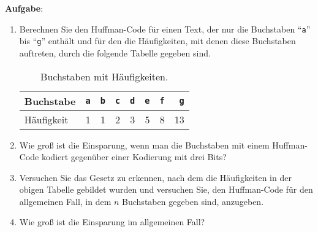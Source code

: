 \noindent
\textbf{Aufgabe}:
\begin{enumerate}
\item Berechnen Sie den Huffman-Code f\"ur einen Text, der nur die Buchstaben
      ``\texttt{a}'' bis ``\texttt{g}'' enth\"alt und f\"ur den die H\"aufigkeiten,
      mit denen diese Buchstaben auftreten, durch die folgende Tabelle gegeben sind.

\begin{table}[htbp]
  \centering
\begin{tabular}[t]{|l|r|r|r|r|r|r|r|}
\hline
Buchstabe  & \texttt{a} & \texttt{b} & \texttt{c} & \texttt{d} & \texttt{e} & \texttt{f} & \texttt{g} \\
\hline
H\"aufigkeit &          1 &          1 &          2 &          3 &          5 &         8 &         13 \\
\hline
\end{tabular}
  \caption{Buchstaben mit H\"aufigkeiten.}
  \label{tab:aufgabe-huffman}
\end{table}

\item Wie gro{\ss} ist die Einsparung, wenn man die Buchstaben mit einem Huffman-Code
      kodiert gegen\"uber einer Kodierung mit drei Bits?
\item Versuchen Sie das Gesetz zu erkennen, nach dem die H\"aufigkeiten in der obigen Tabelle 
      gebildet wurden und versuchen Sie, den Huffman-Code f\"ur den allgemeinen Fall,
      in dem $n$ Buchstaben gegeben sind, anzugeben.
\item Wie gro{\ss} ist die Einsparung im allgemeinen Fall?
\end{enumerate}


